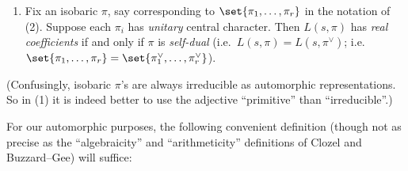 \documentclass[12pt]{report}
\begin{document}
{\begin{enumerate}[(1)]
    \item Fix an isobaric $\pi$,
    say corresponding to $\set{\pi_1,\dots,\pi_r}$
    in the notation of (2).
    Suppose each $\pi_i$ has \emph{unitary} central character.
    Then $L(s,\pi)$ has \emph{real coefficients}
    if and only if
    $\pi$ is \emph{self-dual}
    (i.e.~$L(s,\pi)=L(s,\pi^\vee)$;
    i.e.~$\set{\pi_1,\dots,\pi_r}=\set{\pi_1^\vee,\dots,\pi_r^\vee}$).
\end{enumerate}
(Confusingly,
isobaric $\pi$'s are always irreducible as automorphic representations.
So in (1) it is indeed better to use the adjective ``primitive'' than ``irreducible''.)
}

For our automorphic purposes,
the following convenient definition
(though not as precise as the ``algebraicity'' and ``arithmeticity'' definitions of Clozel and Buzzard--Gee)
will suffice:
\defn{
\label{DEFN:nice-isobaric-pi's}
Call an isobaric $\pi$ \emph{nice}
if each cuspidal constituent of $\pi$ has \emph{unitary, finite-order} central character.
}
\end{document}
